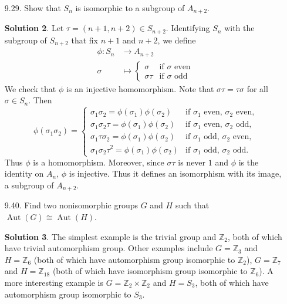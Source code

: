 \documentclass{article}
\newcommand{\ZZ}{\mathbb{Z}}
\DeclareMathOperator{\Aut}{Aut}
\theoremstyle{definition}
\newtheorem*{solution}{Solution}
\begin{document}
\begin{enumerate}
\begin{solution}
Note that the assertion is true if $K$ is finite, but it's difficult to show.  Many people tried to used an isomorphism $\phi : G \times K \to H \times K$ to construct an isomorphism $G \to H$.  The difficulty is that $\phi$ does not necessarily map $G \times \{1\}$ to $H \times \{1\}$ (and if it does, it may not be surjective).
\end{solution}
\item[9.29.] Show that $S_n$ is isomorphic to a subgroup of $A_{n+2}$.
\begin{solution}
Let $\tau = (n+1, n+2) \in S_{n+2}$.  Identifying $S_n$ with the subgroup of $S_{n+2}$ that fix $n+1$ and $n+2$, we define
\begin{align*}
\phi : S_n &\to A_{n+2} \\
\sigma &\mapsto \begin{cases} \sigma & \mbox{if $\sigma$ even} \\
\sigma \tau & \mbox{if $\sigma$ odd} \end{cases}
\end{align*}
We check that $\phi$ is an injective homomorphism.  Note that $\sigma \tau = \tau \sigma$ for all $\sigma \in S_n$.  Then
\[
\phi(\sigma_1 \sigma_2) = \begin{cases}
\sigma_1 \sigma_2 = \phi(\sigma_1)\phi(\sigma_2) & \mbox{if $\sigma_1$ even, $\sigma_2$ even,} \\
\sigma_1 \sigma_2 \tau = \phi(\sigma_1)\phi(\sigma_2) & \mbox{if $\sigma_1$ even, $\sigma_2$ odd,} \\
\sigma_1 \tau \sigma_2 = \phi(\sigma_1)\phi(\sigma_2) & \mbox{if $\sigma_1$ odd, $\sigma_2$ even,} \\
\sigma_1 \sigma_2 \tau^2 = \phi(\sigma_1)\phi(\sigma_2) & \mbox{if $\sigma_1$ odd, $\sigma_2$ odd.}
\end{cases}
\]
Thus $\phi$ is a homomorphism.  Moreover, since $\sigma \tau$ is never $1$ and $\phi$ is the identity on $A_n$, $\phi$ is injective.  Thus it defines an isomorphism with its image, a subgroup of $A_{n+2}$.
\end{solution}
\item[9.40.] Find two nonisomorphic groups $G$ and $H$ such that $\Aut(G) \cong \Aut(H)$.
\begin{solution}
The simplest example is the trivial group and $\ZZ_2$, both of which have trivial automorphism group.  Other examples include $G=\ZZ_3$ and $H=\ZZ_6$ (both of which have automorphism group isomorphic to $\ZZ_2$), $G=\ZZ_7$ and $H=\ZZ_{18}$ (both of which have isomorphism group isomorphic to $\ZZ_6$).  A more interesting example is $G = \ZZ_2\times\ZZ_2$ and $H=S_3$, both of which have automorphism group isomorphic to $S_3$.

\end{solution}
\end{enumerate}
\end{document}

